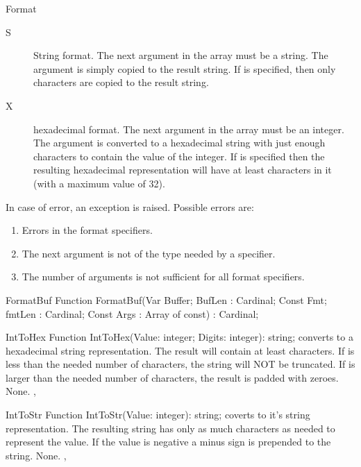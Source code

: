\begin{function}{Format}
\begin{description}
\item[S] String format. The next argument in the  array must be
a string. The argument is simply copied to the result string. If
 is specified, then only  characters are
copied to the result string.

\item[X] hexadecimal format. The next argument in the  array must
be an integer. The argument is converted to a hexadecimal string with just
enough characters to contain the value of the integer. If 
is specified then the resulting hexadecimal representation will have at
least  characters in it (with a maximum value of 32).
\end{description}
\Errors
In case of error, an  exception is raised. Possible
errors are:
\begin{enumerate}
\item Errors in the format specifiers. 
\item The next argument is not of the type needed by a specifier.
\item The number of arguments is not sufficient for all format specifiers.
\end{enumerate}
\SeeAlso
{}
\end{function}


 
\begin{function}{FormatBuf}
\Declaration
Function FormatBuf(Var Buffer; BufLen : Cardinal; Const Fmt; fmtLen : Cardinal; Const Args : Array of const) : Cardinal;
\Description
{}
\Errors
\SeeAlso
\end{function}



\begin{function}{IntToHex}
\Declaration
Function IntToHex(Value: integer; Digits: integer): string;
\Description
{} converts  to a hexadecimal string
representation. The result will contain at least  
characters. If  is less than the needed number of characters,
the string will NOT be truncated. If  is larger than the needed
number of characters, the result is padded with zeroes.
\Errors
None.
\SeeAlso
{}, 
\end{function}



\begin{function}{IntToStr}
\Declaration
Function IntToStr(Value: integer): string;
\Description
{} coverts  to it's string representation.
The resulting string has only as much characters as needed to represent
the value. If the value is negative a minus sign is prepended to the 
string.
\Errors
None.
\SeeAlso
{}, 
\end{function}

